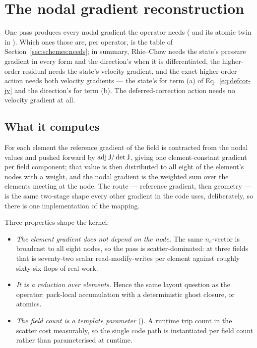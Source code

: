 \section{The nodal gradient reconstruction}
\label{sec:recon}

One pass produces every nodal gradient the operator needs
( and its atomic twin in
). Which ones those are, per operator, is the table
of Section~\ref{sec:schemes:needs}; in summary, Rhie--Chow needs the state's pressure gradient in
every form and the direction's when it is differentiated, the higher-order residual needs the
state's velocity gradient, and the exact higher-order action needs both velocity gradients ---
the state's for term (a) of Eq.~\eqref{eq:defcor-jv} and the direction's for term (b). The
deferred-correction action needs no velocity gradient at all.

\subsection{What it computes}

For each element the reference gradient of the field is contracted from the nodal values and
pushed forward by $\operatorname{adj}\mathsf{J}/\det\mathsf{J}$, giving one element-constant gradient per field
component; that value is then distributed to all eight of the element's nodes with a weight, and
the nodal gradient is the weighted sum over the elements meeting at the node. The route ---
reference gradient, then geometry --- is the same two-stage shape every other gradient in the code
uses, deliberately, so there is one implementation of the mapping.

Three properties shape the kernel:

\begin{itemize}
\item \emph{The element gradient does not depend on the node.} The same $n_c$-vector is
      broadcast to all eight nodes, so the pass is scatter-dominated: at three fields that is
      seventy-two scalar read-modify-writes per element against roughly sixty-six flops of real
      work.
\item \emph{It is a reduction over elements.} Hence the same layout question as the operator:
      pack-local accumulation with a deterministic ghost closure, or atomics.
\item \emph{The field count is a template parameter} (). A runtime trip count in the
      scatter cost measurably, so the single code path is instantiated per field count rather than
      parameterised at runtime.
\end{itemize}

